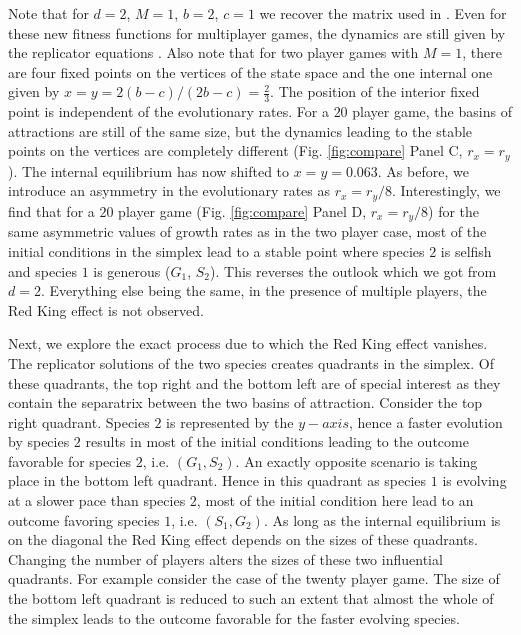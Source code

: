 \documentclass[a4paper]{scrartcl}
\begin{document}
Note that for $d=2$, $M=1$, $b=2$, $c=1$ we recover the matrix used in \citep{bergstrom:2003jf}.
Even for these new fitness functions for multiplayer games, the dynamics are still given by the replicator equations \citep{hauert:2006fd,pacheco:2009aa,gokhale:2010pn}.
Also note that for two player games with $M=1$, there are four fixed points on the vertices of the state space and the one internal one given by $x = y = 2 (b-c)/(2 b - c) = \frac{2}{3}$.
The position of the interior fixed point is independent of the evolutionary rates.
For a $20$ player game, the basins of attractions are still of the same size, but the dynamics leading to the stable points on the vertices are completely different (Fig. \ref{fig:compare} Panel C, $r_x=r_y$).
The internal equilibrium has now shifted to $x = y = 0.063$.
As before, we introduce an asymmetry in the evolutionary rates as $r_x = r_y /8$.
Interestingly, we find that for a $20$ player game (Fig. \ref{fig:compare} Panel D, $r_x=r_y/8$) for the same asymmetric values of growth rates as in the two player case, most of the initial conditions in the simplex lead to a stable point where species $2$ is selfish and species $1$ is generous ($G_1$, $S_2$).
This  reverses the outlook which we got from $d=2$.
Everything else being the same, in the presence of multiple players, the Red King effect is not observed.

Next, we explore the exact process due to which the Red King effect vanishes.
The replicator solutions of the two species creates quadrants in the simplex.
Of these quadrants, the top right and the bottom left are of special interest as they contain the separatrix between the two basins of attraction.
Consider the top right quadrant.
Species $2$ is represented by the $y-axis$, hence a faster evolution by species $2$ results in most of the initial conditions leading to the outcome favorable for species $2$, i.e. $(G_1,S_2)$.
An exactly opposite scenario is taking place in the bottom left quadrant.
Hence in this quadrant as species $1$ is evolving at a slower pace than species $2$, most of the initial condition here lead to an outcome favoring species $1$, i.e. $(S_1, G_2)$.
As long as the internal equilibrium is on the diagonal the Red King effect depends on the sizes of these quadrants.
Changing the number of players alters the sizes of these two influential quadrants.
For example consider the case of the twenty player game.
The size of the bottom left quadrant is reduced to such an extent that almost the whole of the simplex leads to the outcome favorable for the faster evolving species.
\end{document}
